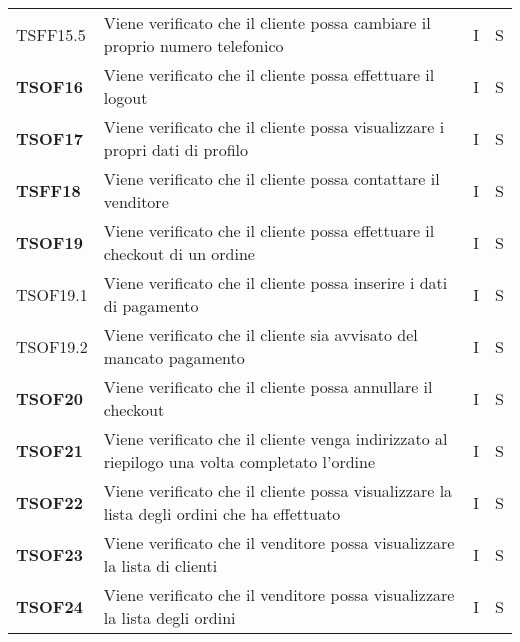 \begin{center}
\begin{longtable}[!h]{p{60px} p{240px} p{35px} p{35px}}
        TSFF15.5        & Viene verificato che il cliente possa cambiare il proprio numero telefonico                                          & I              & S              \\
        \textbf{TSOF16} & Viene verificato che il cliente possa effettuare il logout                                                           & I              & S              \\
        \textbf{TSOF17} & Viene verificato che il cliente possa visualizzare i propri dati di profilo                                          & I              & S              \\
        \textbf{TSFF18} & Viene verificato che il cliente possa contattare il venditore                                                        & I              & S              \\
        \textbf{TSOF19} & Viene verificato che il cliente possa effettuare il checkout di un ordine                                            & I              & S              \\
        TSOF19.1        & Viene verificato che il cliente possa inserire i dati di pagamento                                                   & I              & S              \\
        TSOF19.2        & Viene verificato che il cliente sia avvisato del mancato pagamento                                                   & I              & S              \\
        \textbf{TSOF20} & Viene verificato che il cliente possa annullare il checkout                                                          & I              & S              \\
        \textbf{TSOF21} & Viene verificato che il cliente venga indirizzato al riepilogo una volta completato l'ordine                         & I              & S              \\
        \textbf{TSOF22} & Viene verificato che il cliente possa visualizzare la lista degli ordini che ha effettuato                           & I              & S              \\
        \textbf{TSOF23} & Viene verificato che il venditore possa visualizzare la lista di clienti                                             & I              & S              \\
        \textbf{TSOF24} & Viene verificato che il venditore possa visualizzare la lista degli ordini                                           & I              & S              \\

\end{longtable}
\end{center}
